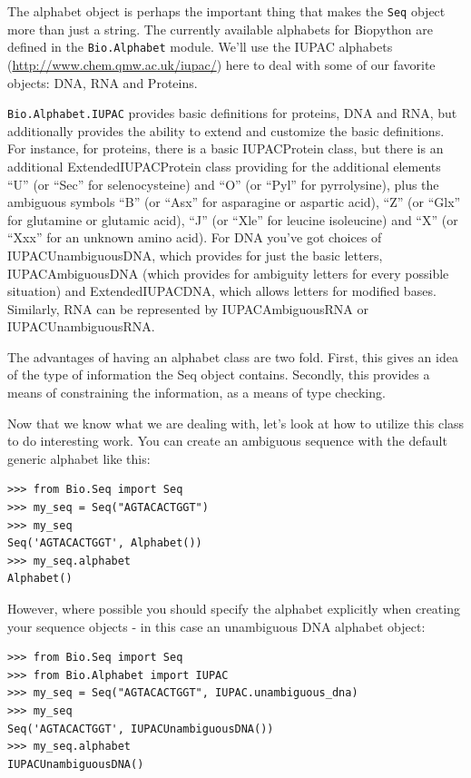 \documentclass{report}
\begin{document}
The alphabet object is perhaps the important thing that makes the \verb|Seq| object more than just a string. The currently available alphabets for Biopython are defined in the \verb|Bio.Alphabet| module. We'll use the IUPAC alphabets (\url{http://www.chem.qmw.ac.uk/iupac/}) here to deal with some of our favorite objects: DNA, RNA and Proteins.

\verb|Bio.Alphabet.IUPAC| provides basic definitions for proteins, DNA and RNA, but additionally provides the ability to extend and customize the basic definitions. For instance, for proteins, there is a basic IUPACProtein class, but there is an additional ExtendedIUPACProtein class providing for the additional elements ``U'' (or ``Sec'' for selenocysteine) and ``O'' (or ``Pyl'' for pyrrolysine), plus the ambiguous symbols ``B'' (or ``Asx'' for asparagine or aspartic acid), ``Z'' (or ``Glx'' for glutamine or glutamic acid), ``J'' (or ``Xle'' for leucine isoleucine) and ``X'' (or ``Xxx'' for an unknown amino acid). For DNA you've got choices of IUPACUnambiguousDNA, which provides for just the basic letters, IUPACAmbiguousDNA (which provides for ambiguity letters for every possible situation) and ExtendedIUPACDNA, which allows letters for modified bases. Similarly, RNA can be represented by IUPACAmbiguousRNA or IUPACUnambiguousRNA.

The advantages of having an alphabet class are two fold. First, this gives an idea of the type of information the Seq object contains. Secondly, this provides a means of constraining the information, as a means of type checking.

Now that we know what we are dealing with, let's look at how to utilize this class to do interesting work.
You can create an ambiguous sequence with the default generic alphabet like this:

\begin{verbatim}
>>> from Bio.Seq import Seq
>>> my_seq = Seq("AGTACACTGGT")
>>> my_seq
Seq('AGTACACTGGT', Alphabet())
>>> my_seq.alphabet
Alphabet()
\end{verbatim}

However, where possible you should specify the alphabet explicitly when creating your sequence objects - in this case an unambiguous DNA alphabet object:

\begin{verbatim}
>>> from Bio.Seq import Seq
>>> from Bio.Alphabet import IUPAC
>>> my_seq = Seq("AGTACACTGGT", IUPAC.unambiguous_dna)
>>> my_seq
Seq('AGTACACTGGT', IUPACUnambiguousDNA())
>>> my_seq.alphabet
IUPACUnambiguousDNA()
\end{verbatim}
\end{document}
